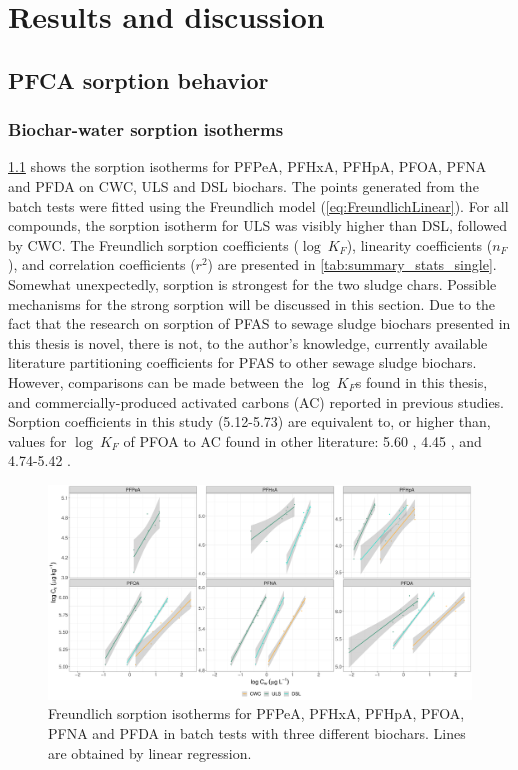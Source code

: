 \chapter{Results and discussion}\label{chap:Results&Disc}
\section{PFCA sorption behavior}
\subsection{Biochar-water sorption isotherms}
\cref{fig:sorption_isotherms} shows the sorption isotherms for PFPeA, PFHxA, PFHpA, PFOA, PFNA and PFDA on CWC, ULS and DSL biochars. The points generated from the batch tests were fitted using the Freundlich model (\cref{eq:FreundlichLinear}). For all compounds, the sorption isotherm for ULS was visibly higher than DSL, followed by CWC. The Freundlich sorption coefficients ($\log~K_F$), linearity coefficients ($n_F$), and correlation coefficients ($r^2$) are presented in \cref{tab:summary_stats_single}. Somewhat unexpectedly, sorption is strongest for the two sludge chars. Possible mechanisms for the strong sorption will be discussed in this section. Due to the fact that the research on sorption of PFAS to sewage sludge biochars presented in this thesis is novel, there is not, to the author's knowledge, currently available literature partitioning coefficients for PFAS to other sewage sludge biochars. However, comparisons can be made between the $\log~K_F$s found in this thesis, and commercially-produced activated carbons (AC) reported in previous studies. Sorption coefficients in this study (5.12-5.73) are equivalent to, or higher than, values for $\log~K_F$ of PFOA to AC found in other literature: 5.60 \citep{kupryianchyk2016biochar}, 4.45 \citep{hansen2010sorption}, and 4.74-5.42 \citep{silvani2019can}. 

\begin{figure}[tb]
    \centering
    \includegraphics[width=\textwidth]{R/figs/Sorption_isotherms_single_BC.pdf}
    \caption{Freundlich sorption isotherms for PFPeA, PFHxA, PFHpA, PFOA, PFNA and PFDA in batch tests with three different biochars. Lines are obtained by linear regression.}
    \label{fig:sorption_isotherms}
\end{figure}

